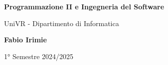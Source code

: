 \begin{titlepage}
	\begin{center}
		\vspace*{1cm}

		\Huge
    \textbf{Programmazione II e Ingegneria del Software}

		\vspace{0.5cm}
		\LARGE
		UniVR - Dipartimento di Informatica

		\vspace{1.5cm}

		\textbf{Fabio Irimie}

		\vfill


		\vspace{0.8cm}


		1° Semestre 2024/2025

	\end{center}
\end{titlepage}
